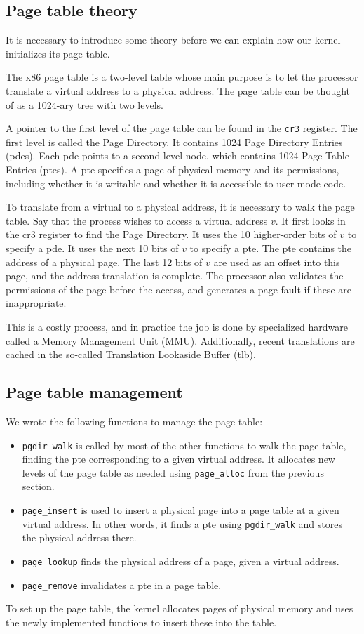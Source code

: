 \documentclass{article}
\begin{document}
\subsection{Page table theory}
It is necessary to introduce some theory before we can explain how our kernel
initializes its page table.

The x86 page table is a two-level table whose main purpose is to let the
processor translate a virtual address to a physical address. The page table
can be thought of as a 1024-ary tree with two levels. 

A pointer to the first level of the page table can be found in the
\texttt{cr3} register. The first level is called the Page Directory. It
contains 1024 Page Directory Entries (\gls{pde}s). Each \gls{pde} points to a
second-level node, which contains 1024 Page Table Entries (\gls{pte}s). 
A \gls{pte} specifies a page of physical memory and its permissions, including
whether it is writable and whether it is accessible to user-mode code.

To translate from a virtual to a physical address, it is necessary to walk the
page table. Say that the process wishes to access a virtual address $v$. It
first looks in the \gls{cr3} register to find the Page Directory. It uses the
10 higher-order bits of $v$ to specify a \gls{pde}. It uses the next 10 bits
of $v$ to specify a \gls{pte}. The \gls{pte} contains the address of a
physical page. The last 12 bits of $v$ are used as an offset into this page,
and the address translation is complete. The processor also validates the
permissions of the page before the access, and generates a page fault if these
are inappropriate.

This is a costly process, and in practice the job is done by specialized
hardware called a Memory Management Unit (MMU). Additionally, recent
translations are cached in the so-called Translation Lookaside Buffer
(\gls{tlb}).


\subsection{Page table management}
\label{sec:pagetables}
We wrote the following functions to manage the page table:
\begin{itemize}
\item \texttt{pgdir\_walk} is called by most of the other functions to walk the
page table, finding the \gls{pte} corresponding to a given virtual address. It
allocates new levels of the page table as needed using \texttt{page\_alloc}
from the previous section.
\item \texttt{page\_insert} is used to insert a physical page into a page
table at a given virtual address. In other words, it finds a \gls{pte} using
\texttt{pgdir\_walk} and stores the physical address there.
\item \texttt{page\_lookup} finds the physical address of a page, given a
virtual address.
\item \texttt{page\_remove} invalidates a \gls{pte} in a page table.
\end{itemize}
To set up the page table, the kernel allocates pages of physical memory and
uses the newly implemented functions to insert these into the table.
\end{document}
